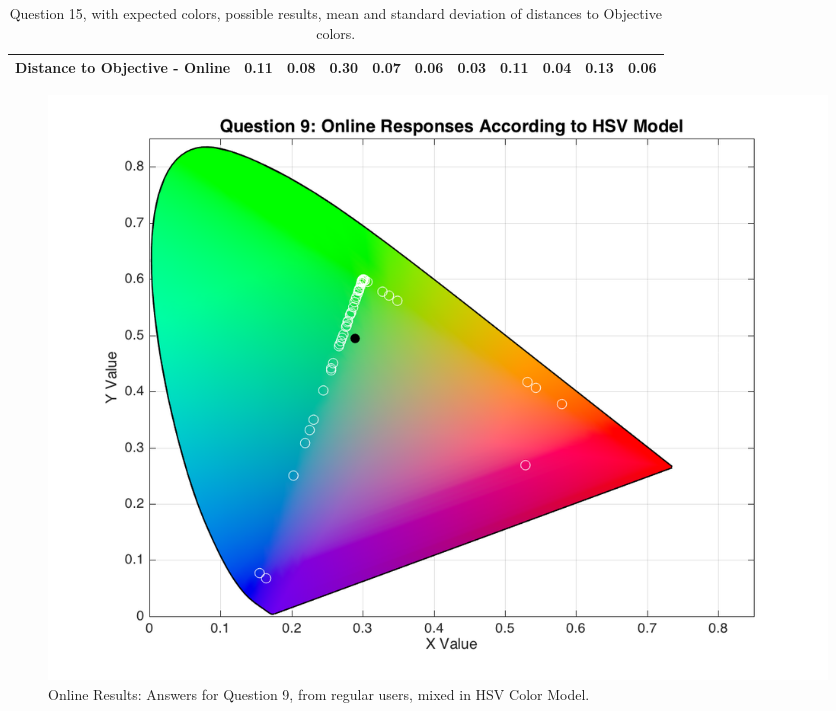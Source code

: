 \begin{table}[H]
{\begin{tabular}{lccccccccccccc}
    \multicolumn{4}{l}{Distance to Objective - Online}                                                                                               & \multicolumn{1}{|c}{0.11}        & \multicolumn{1}{c|}{0.08}    & \multicolumn{1}{|c}{0.30}        & \multicolumn{1}{c|}{0.07}    & \multicolumn{1}{|c}{\textbf{0.06}}       & \multicolumn{1}{c|}{0.03}    & \multicolumn{1}{|c}{0.11}        & \multicolumn{1}{c|}{0.04}    & \multicolumn{1}{|c}{0.13}       & \multicolumn{1}{c|}{0.06}    \\ \hline
    \end{tabular}}
  \caption[Question 15, with expected Results.]{Question 15, with expected colors, possible results, mean and standard deviation of distances to Objective colors.}
  \label{table:lab_q15_expected}
\end{table}
%
\begin{figure}[htbp]
  \centering
  \begin{minipage}{0.48\textwidth}
    \centering
    \includegraphics[width=\textwidth]{images/results/9_online_HSVresponses.png}
    \caption[Online Results: Answers for Question 9, from regular users, mixed in HSV Color Model.]{Online Results: Answers for Question 9, from regular users, mixed in HSV Color Model.}
    \label{fig:onlinehsvregular_9}
  \end{minipage}\hfill
  \begin{minipage}{0.48\textwidth}
    \centering

\end{minipage}
\end{figure}
